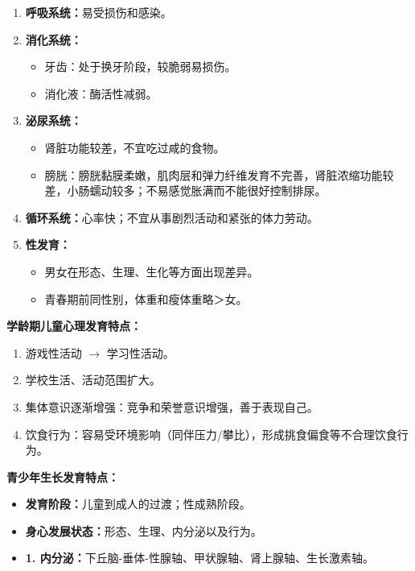 \begin{keybox}
\begin{enumerate}[leftmargin=*]
    \item \textbf{呼吸系统：}易受损伤和感染。

    \item \textbf{消化系统：}
    \begin{itemize}
        \item 牙齿：处于换牙阶段，较脆弱易损伤。
        \item 消化液：酶活性减弱。
    \end{itemize}

    \item \textbf{泌尿系统：}
    \begin{itemize}
        \item 肾脏功能较差，不宜吃过咸的食物。
        \item 膀胱：膀胱黏膜柔嫩，肌肉层和弹力纤维发育不完善，肾脏浓缩功能较差，小肠蠕动较多；不易感觉胀满而不能很好控制排尿。
    \end{itemize}

    \item \textbf{循环系统：}心率快；不宜从事剧烈活动和紧张的体力劳动。

    \item \textbf{性发育：}
    \begin{itemize}
        \item 男女在形态、生理、生化等方面出现差异。
        \item 青春期前同性别，体重和瘦体重略＞女。
    \end{itemize}
\end{enumerate}

\textbf{学龄期儿童心理发育特点：}
\begin{enumerate}[leftmargin=*]
    \item 游戏性活动 $\rightarrow$ 学习性活动。
    \item 学校生活、活动范围扩大。
    \item 集体意识逐渐增强：竞争和荣誉意识增强，善于表现自己。
    \item 饮食行为：容易受环境影响（同伴压力/攀比），形成挑食偏食等不合理饮食行为。
\end{enumerate}

\textbf{青少年生长发育特点：}
\begin{itemize}[leftmargin=*]
    \item \textbf{发育阶段：}儿童到成人的过渡；性成熟阶段。
    \item \textbf{身心发展状态：}形态、生理、内分泌以及行为。

    \item \textbf{1. 内分泌：}下丘脑-垂体-性腺轴、甲状腺轴、肾上腺轴、生长激素轴。


\end{itemize}
\end{keybox}
